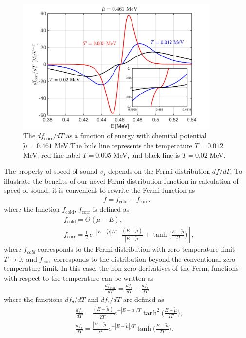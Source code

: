 \documentclass[sn-mathphys,Numbered]{sn-jnl}
\theoremstyle{thmstyleone}%
\theoremstyle{thmstyletwo}%
\theoremstyle{thmstylethree}%
\begin{document}
\begin{figure}[h]
\begin{center}
\includegraphics[width=0.9\textwidth]{./plot/NewFermi_dfdT_tot}
\caption{
The $df_\mathrm{corr}/dT$ as a function of energy with chemical potential $\tilde\mu=0.461$ MeV.The bule line represents the temperature $T=0.012$ MeV, red line label $T=0.005$ MeV, and black line is $T=0.02$ MeV.}
\label{dfdT_tot_fig}
\end{center}
\end{figure}

The property of speed of sound $v_s$ depends on the Fermi distribution $df/dT$. To illustrate the benefits of our novel Fermi distribution
function in calculation of speed of sound, it is convenient to rewrite the Fermi-function as 
\begin{align}
f=f_{\mathrm{cold}} +f_\mathrm{corr}.
\end{align}
where the function $f_{\mathrm{cold}}$, $f_\mathrm{corr}$ is defined as
\begin{align}
&f_{\mathrm{cold}}=\Theta(\tilde\mu-E),\\
&f_\mathrm{corr}=\frac{1}{2}\,e^{-|E-\tilde\mu|/T}\left[\frac{(E-\tilde\mu)}{|E-\tilde\mu|}+\tanh\bigg(\frac{E-\tilde\mu}{2T}\bigg)\right],
\end{align}
where $f_{cold}$ corresponds to the Fermi distribution with zero temperature limit $T\to0$, and $f_\mathrm{corr}$ corresponds to the distribution beyond the conventional zero-temperature limit.
In this case, the non-zero derivatives of the Fermi functions  with respect to the temperature can be written as
\begin{align}
\frac{df_{\mathrm{corr}}}{dT}=\frac{df_\delta}{dT}+\frac{df_\epsilon}{dT}
\end{align}
where the functions ${df_\delta}/{dT}$ and $df_\epsilon/dT$ are defined as
\begin{align}
\label{dfdT001}
&\frac{df_\delta}{dT}=\frac{(E-\tilde\mu)}{2T^2}e^{-|E-\tilde\mu|/T}\tanh^2\bigg(\frac{E-\tilde\mu}{2T}\bigg),\\
\label{dfdT002}
&\frac{df_\epsilon}{dT}=\frac{|E-\tilde\mu|}{T^2}e^{-|E-\tilde\mu|/T}\!\tanh\bigg(\frac{E-\tilde\mu}{2T}\bigg).
\end{align}
\end{document}
